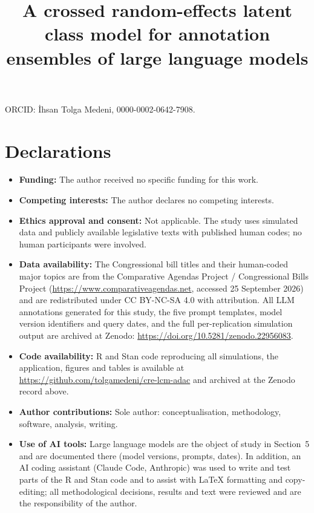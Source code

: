 \documentclass[pdflatex,sn-mathphys-ay]{sn-jnl}
\begin{document}
\title[CRE-LCM for LLM annotation ensembles]{A crossed random-effects latent class model for annotation ensembles of large language models}

\author*[1]{ }



\maketitle

\noindent ORCID: \.{I}hsan Tolga Medeni, 0000-0002-0642-7908.

\section*{Declarations}
\begin{itemize}
\item \textbf{Funding:} The author received no specific funding for this work.
\item \textbf{Competing interests:} The author declares no competing interests.
\item \textbf{Ethics approval and consent:} Not applicable. The study uses simulated data and publicly available legislative texts with published human codes; no human participants were involved.
\item \textbf{Data availability:} The Congressional bill titles and their human-coded major topics are from the Comparative Agendas Project / Congressional Bills Project (\url{https://www.comparativeagendas.net}, accessed 25 September 2026) and are redistributed under CC BY-NC-SA 4.0 with attribution. All LLM annotations generated for this study, the five prompt templates, model version identifiers and query dates, and the full per-replication simulation output are archived at Zenodo: \url{https://doi.org/10.5281/zenodo.22956083}.
\item \textbf{Code availability:} R and Stan code reproducing all simulations, the application, figures and tables is available at \url{https://github.com/tolgamedeni/cre-lcm-adac} and archived at the Zenodo record above.
\item \textbf{Author contributions:} Sole author: conceptualisation, methodology, software, analysis, writing.
\item \textbf{Use of AI tools:} Large language models are the object of study in Section~5 and are documented there (model versions, prompts, dates). In addition, an AI coding assistant (Claude Code, Anthropic) was used to write and test parts of the R and Stan code and to assist with LaTeX formatting and copy-editing; all methodological decisions, results and text were reviewed and are the responsibility of the author.
\end{itemize}
\end{document}
